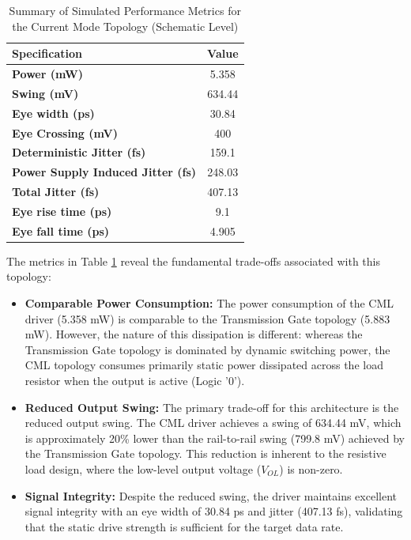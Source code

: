 \documentclass[12pt, a4paper]{report}
\begin{document}
\begin{table}[H]
    \centering
    \caption{Summary of Simulated Performance Metrics for the Current Mode Topology (Schematic Level)}
    \label{tab:cml_metrics}
    \renewcommand{\arraystretch}{1.4}
    \setlength{\tabcolsep}{12pt}
    \begin{tabular}{|l|c|}
        \hline
        \textbf{Specification} & \textbf{Value} \\ \hline
        \textbf{Power (mW)} & 5.358 \\ \hline
        \textbf{Swing (mV)} & 634.44 \\ \hline
        \textbf{Eye width (ps)} & 30.84 \\ \hline
        \textbf{Eye Crossing (mV)} & 400 \\ \hline
        \textbf{Deterministic Jitter (fs)} & 159.1 \\ \hline
        \textbf{Power Supply Induced Jitter (fs)} & 248.03 \\ \hline
        \textbf{Total Jitter (fs)} & 407.13 \\ \hline
        \textbf{Eye rise time (ps)} & 9.1 \\ \hline
        \textbf{Eye fall time (ps)} & 4.905 \\ \hline
    \end{tabular}
\end{table}

The metrics in Table \ref{tab:cml_metrics} reveal the fundamental trade-offs associated with this topology:

\begin{itemize}
    \item \textbf{Comparable Power Consumption:} The power consumption of the CML driver (5.358 mW) is comparable to the Transmission Gate topology (5.883 mW). However, the nature of this dissipation is different: whereas the Transmission Gate topology is dominated by dynamic switching power, the CML topology consumes primarily static power dissipated across the load resistor when the output is active (Logic '0').
    
    \item \textbf{Reduced Output Swing:} The primary trade-off for this architecture is the reduced output swing. The CML driver achieves a swing of 634.44 mV, which is approximately 20\% lower than the rail-to-rail swing (799.8 mV) achieved by the Transmission Gate topology. This reduction is inherent to the resistive load design, where the low-level output voltage ($V_{OL}$) is non-zero.
    
    \item \textbf{Signal Integrity:} Despite the reduced swing, the driver maintains excellent signal integrity with an eye width of 30.84 ps and jitter (407.13 fs), validating that the static drive strength is sufficient for the target data rate.
\end{itemize}
\end{document}
